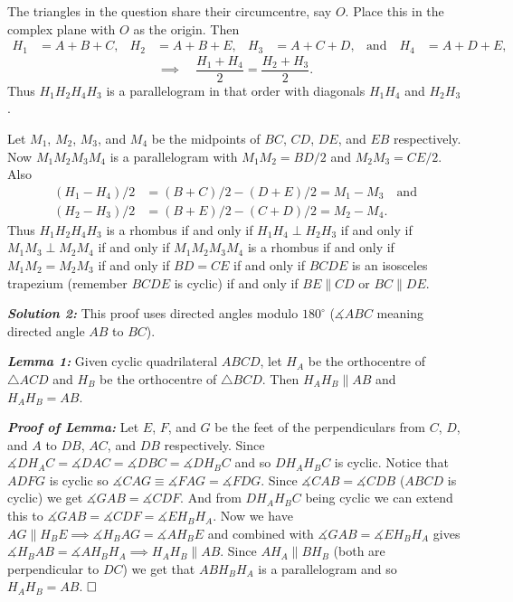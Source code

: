 \documentclass[11pt]{article}
\newcommand{\solnum}[1]{\textbf{\textit{Solution #1: }}}
\newcommand{\dir}[0]{\measuredangle}
\begin{document}
\begin{enumerate}[topsep=\bigskipamount,itemsep=\bigskipamount,leftmargin=0pt]
The triangles in the question share their circumcentre, say $O$.
Place this in the complex plane with $O$ as the origin.
Then
\begin{align*}
    H_1 & = A+B+C, & H_2 & = A+B+E, & H_3 & = A+C+D, & \text{and} \quad H_4 & = A+D+E,
\end{align*}
\[ \implies \quad \frac{H_1+H_4}{2} = \frac{H_2+H_3}{2}. \]
Thus $H_1H_2H_4H_3$ is a parallelogram in that order with diagonals $H_1H_4$ and $H_2H_3$.

Let $M_1$, $M_2$, $M_3$, and $M_4$ be the midpoints of $BC$, $CD$, $DE$, and $EB$ respectively.
Now $M_1M_2M_3M_4$ is a parallelogram with $M_1M_2 = BD/2$ and $M_2M_3 = CE/2$.
Also
\begin{align*}
    (H_1-H_4)/2 &= (B+C)/2 - (D+E)/2 = M_1 - M_3 \quad \text{and} \\
    (H_2-H_3)/2 &= (B+E)/2 - (C+D)/2 = M_2 - M_4.
\end{align*}
Thus $H_1H_2H_4H_3$ is a rhombus
if and only if $H_1H_4 \perp H_2H_3$
if and only if $M_1M_3 \perp M_2M_4$
if and only if $M_1M_2M_3M_4$ is a rhombus
if and only if $M_1M_2 = M_2M_3$
if and only if $BD = CE$
if and only if $BCDE$ is an isosceles trapezium (remember $BCDE$ is cyclic)
if and only if $BE \parallel CD$ or $BC\parallel DE$.


\solnum{2} This proof uses directed angles modulo $180^{\circ}$ ($\dir ABC$ meaning directed angle $AB$ to $BC$).

\textbf{\textit{Lemma 1:}} Given cyclic quadrilateral $ABCD$, let $H_A$ be the orthocentre of $\triangle ACD$ and $H_B$ be the orthocentre of $\triangle BCD$. Then $H_AH_B \parallel AB$ and $H_AH_B=AB$.

\textbf{\textit{Proof of Lemma:}} Let $E$, $F$, and $G$ be the feet of the perpendiculars from $C$, $D$, and $A$ to $DB$, $AC$, and $DB$ respectively.
Since $\dir DH_AC=\dir DAC=\dir DBC=\dir DH_BC$ and so $DH_AH_BC$ is cyclic.
Notice that $ADFG$ is cyclic so $\dir CAG\equiv\dir FAG = \dir FDG$.
Since $\dir CAB = \dir CDB$ ($ABCD$ is cyclic) we get $\dir GAB = \dir CDF$.
And from $DH_AH_BC$ being cyclic we can extend this to $\dir GAB = \dir CDF = \dir EH_BH_A$.
Now we have $AG\parallel H_BE\implies \dir H_BAG = \dir AH_BE$ and combined with $\dir GAB = \dir EH_BH_A$ gives $\dir H_BAB = \dir AH_BH_A\implies H_AH_B\parallel AB$.
Since $AH_A\parallel BH_B$ (both are perpendicular to $DC$) we get that $ABH_BH_A$ is a parallelogram and so $H_AH_B=AB$. $\hfill\square$


\end{enumerate}
\end{document}
